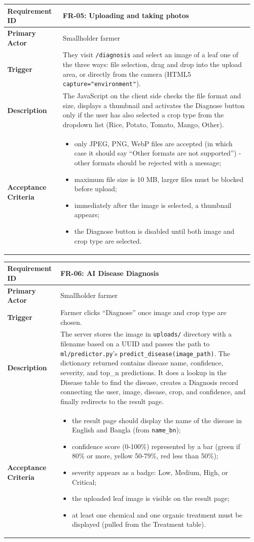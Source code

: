 \documentclass[12pt,a4paper]{article}
\newcommand{\frbox}[5]{%
  \begin{table}[H]
  \centering
  \begin{tabularx}{\textwidth}{|l|X|}
  \hline
  \rowcolor{lightgreen}
  \textbf{Requirement ID} & \textbf{#1} \\
  \hline
  \textbf{Primary Actor} & #2 \\
  \hline
  \textbf{Trigger} & #3 \\
  \hline
  \textbf{Description} & #4 \\
  \hline
  \rowcolor{lightgreen}
  \textbf{Acceptance Criteria} & #5 \\
  \hline
  \end{tabularx}
  \end{table}
}
\begin{document}
\frbox{FR-05: Uploading and taking photos}
{Smallholder farmer}
{They visit \texttt{/diagnosis} and select an image of a leaf one of the three ways: file selection, drag and drop into the upload area, or directly from the camera (HTML5 \texttt{capture="environment"}).}
{The JavaScript on the client side checks the file format and size, displays a thumbnail and activates the Diagnose button only if the user has also selected a crop type from the dropdown list (Rice, Potato, Tomato, Mango, Other).}
{%
\begin{itemize}[leftmargin=1.5em]
  \item only JPEG, PNG, WebP files are accepted (in which case it should say ``Other formats are not supported'') - other formats should be rejected with a message;
  \item maximum file size is 10 MB, larger files must be blocked before upload;
  \item immediately after the image is selected, a thumbnail appears;
  \item the Diagnose button is disabled until both image and crop type are selected.
\end{itemize}
}

\frbox{FR-06: AI Disease Diagnosis}
{Smallholder farmer}
{Farmer clicks ``Diagnose'' once image and crop type are chosen.}
{The server stores the image in \texttt{uploads/} directory with a filename based on a UUID and passes the path to \texttt{ml/predictor.py}'s \texttt{predict\_disease(image\_path)}. The dictionary returned contains disease name, confidence, severity, and top\_n predictions. It does a lookup in the Disease table to find the disease, creates a Diagnosis record connecting the user, image, disease, crop, and confidence, and finally redirects to the result page.}
{%
\begin{itemize}[leftmargin=1.5em]
  \item the result page should display the name of the disease in English and Bangla (from \texttt{name\_bn});
  \item confidence score (0-100\%) represented by a bar (green if 80\% or more, yellow 50-79\%, red less than 50\%);
  \item severity appears as a badge: Low, Medium, High, or Critical;
  \item the uploaded leaf image is visible on the result page;
  \item at least one chemical and one organic treatment must be displayed (pulled from the Treatment table).
\end{itemize}
}
\end{document}
